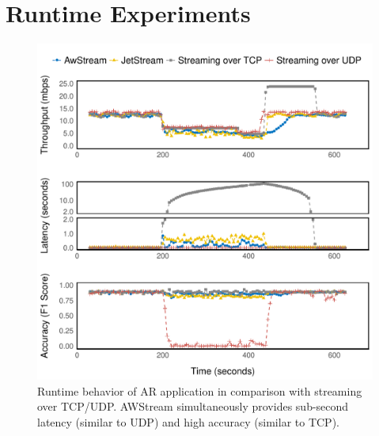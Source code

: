 \section{Runtime Experiments}

\begin{figure}
  \centering
  \includegraphics[width=\columnwidth]{figures/runtime-mot-verticle.pdf}
  \caption{Runtime behavior of AR application in comparison with streaming over
    TCP/UDP\@. AWStream simultaneously provides sub-second latency (similar to
    UDP) and high accuracy (similar to TCP).}
  \label{fig:pd-runtime}
\end{figure}

